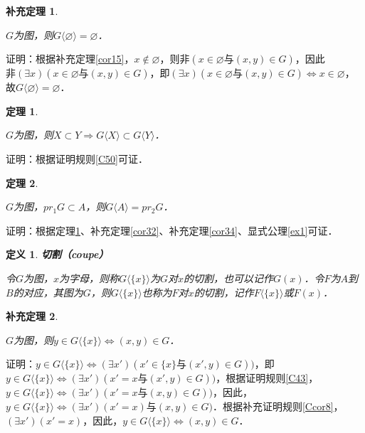 \documentclass[12pt, a4paper, oneside]{book}
\newtheorem{theo}{定理}
\newtheorem{cor}{补充定理}
\newtheorem{de}{定义}
\begin{document}
			
			\begin{cor}\label{cor36}
				\hfill\par
				$G$为图，则$G\langle\varnothing\rangle= \varnothing$．
			\end{cor}
			证明：根据补充定理\ref{cor15}，$x\notin \varnothing$，则$\text{非}(x\in \varnothing\text{与}(x, y)\in G)$，因此$\text{非}(\exists x)(x\in \varnothing\text{与}(x, y)\in G)$，即$(\exists x)(x\in \varnothing\text{与}(x, y)\in G)\Leftrightarrow x\in \varnothing$，故$G\langle\varnothing\rangle=\varnothing$．

			\begin{theo}\label{theo12}
				\hfill\par
				$G$为图，则$X\subset Y\Rightarrow G\langle X \rangle \subset G\langle Y \rangle $．
			\end{theo}
			证明：根据证明规则\ref{C50}可证．

			\begin{theo}\label{theo13}
				\hfill\par
				$G$为图，$pr_1G\subset A$，则$G\langle A \rangle =pr_2G$．
			\end{theo}
			证明：根据定理\ref{theo12}、补充定理\ref{cor32}、补充定理\ref{cor34}、显式公理\ref{ex1}可证．

			\begin{de}
				\textbf{切割（coupe）}
				\par
				令$G$为图，$x$为字母，则称$G\langle\{x\}\rangle$为$G$对$x$的切割，也可以记作$G(x)$．令$F$为$A$到$B$的对应，其图为$G$，则$G\langle\{x\}\rangle$也称为$F$对$x$的切割，记作$F\langle\{x\}\rangle$或$F(x)$．
			\end{de}
					
			\begin{cor}\label{cor37}
				\hfill\par
				$G$为图，则$y\in G\langle \{x\} \rangle \Leftrightarrow (x, y)\in G$．			
			\end{cor}
			证明：$y\in G\langle \{x\} \rangle \Leftrightarrow (\exists x')(x'\in \{x\}\text{与}(x', y)\in G))$，即$y\in G\langle \{x\} \rangle \Leftrightarrow (\exists x')(x'=x\text{与}(x', y)\in G))$，根据证明规则\ref{C43}，$y\in G\langle \{x\} \rangle \Leftrightarrow (\exists x')(x'=x\text{与}(x, y)\in G))$，因此，$y\in G\langle \{x\} \rangle \Leftrightarrow (\exists x')(x'=x)\text{与}(x, y)\in G)$．根据补充证明规则\ref{Ccor8}，$(\exists x')(x'=x)$，因此，$y\in G\langle \{x\} \rangle \Leftrightarrow (x, y)\in G$．
			
\end{document}
